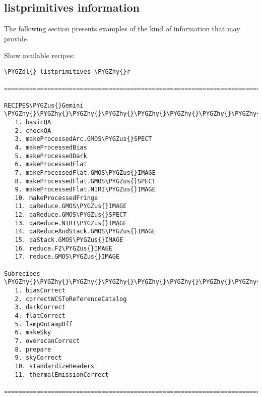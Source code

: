 \documentclass[letterpaper,10pt,english]{sphinxmanual}
\def\PYGZus{\char`\_}
\def\PYGZdl{\char`\$}
\def\PYGZhy{\char`\-}
\begin{document}
\subsection{listprimitives information}
\label{supptools:listprimitives-information}
The following section presents examples of the kind of information that
 may provide.

Show available recipes:

\begin{Verbatim}[commandchars=\\\{\}]
\PYGZdl{} listprimitives \PYGZhy{}r

===============================================================================

RECIPES\PYGZus{}Gemini
\PYGZhy{}\PYGZhy{}\PYGZhy{}\PYGZhy{}\PYGZhy{}\PYGZhy{}\PYGZhy{}\PYGZhy{}\PYGZhy{}\PYGZhy{}\PYGZhy{}\PYGZhy{}\PYGZhy{}\PYGZhy{}\PYGZhy{}\PYGZhy{}\PYGZhy{}\PYGZhy{}\PYGZhy{}\PYGZhy{}\PYGZhy{}\PYGZhy{}\PYGZhy{}\PYGZhy{}\PYGZhy{}\PYGZhy{}\PYGZhy{}\PYGZhy{}\PYGZhy{}\PYGZhy{}\PYGZhy{}\PYGZhy{}\PYGZhy{}\PYGZhy{}\PYGZhy{}\PYGZhy{}\PYGZhy{}\PYGZhy{}\PYGZhy{}\PYGZhy{}\PYGZhy{}\PYGZhy{}\PYGZhy{}\PYGZhy{}\PYGZhy{}\PYGZhy{}\PYGZhy{}\PYGZhy{}\PYGZhy{}\PYGZhy{}\PYGZhy{}\PYGZhy{}\PYGZhy{}\PYGZhy{}\PYGZhy{}\PYGZhy{}\PYGZhy{}\PYGZhy{}\PYGZhy{}\PYGZhy{}\PYGZhy{}\PYGZhy{}\PYGZhy{}\PYGZhy{}\PYGZhy{}\PYGZhy{}\PYGZhy{}\PYGZhy{}\PYGZhy{}\PYGZhy{}\PYGZhy{}\PYGZhy{}\PYGZhy{}\PYGZhy{}\PYGZhy{}\PYGZhy{}\PYGZhy{}\PYGZhy{}\PYGZhy{}
   1. basicQA
   2. checkQA
   3. makeProcessedArc.GMOS\PYGZus{}SPECT
   4. makeProcessedBias
   5. makeProcessedDark
   6. makeProcessedFlat
   7. makeProcessedFlat.GMOS\PYGZus{}IMAGE
   8. makeProcessedFlat.GMOS\PYGZus{}SPECT
   9. makeProcessedFlat.NIRI\PYGZus{}IMAGE
   10. makeProcessedFringe
   11. qaReduce.GMOS\PYGZus{}IMAGE
   12. qaReduce.GMOS\PYGZus{}SPECT
   13. qaReduce.NIRI\PYGZus{}IMAGE
   14. qaReduceAndStack.GMOS\PYGZus{}IMAGE
   15. qaStack.GMOS\PYGZus{}IMAGE
   16. reduce.F2\PYGZus{}IMAGE
   17. reduce.GMOS\PYGZus{}IMAGE

Subrecipes
\PYGZhy{}\PYGZhy{}\PYGZhy{}\PYGZhy{}\PYGZhy{}\PYGZhy{}\PYGZhy{}\PYGZhy{}\PYGZhy{}\PYGZhy{}\PYGZhy{}\PYGZhy{}\PYGZhy{}\PYGZhy{}\PYGZhy{}\PYGZhy{}\PYGZhy{}\PYGZhy{}\PYGZhy{}\PYGZhy{}\PYGZhy{}\PYGZhy{}\PYGZhy{}\PYGZhy{}\PYGZhy{}\PYGZhy{}\PYGZhy{}\PYGZhy{}\PYGZhy{}\PYGZhy{}\PYGZhy{}\PYGZhy{}\PYGZhy{}\PYGZhy{}\PYGZhy{}\PYGZhy{}\PYGZhy{}\PYGZhy{}\PYGZhy{}\PYGZhy{}\PYGZhy{}\PYGZhy{}\PYGZhy{}\PYGZhy{}\PYGZhy{}\PYGZhy{}\PYGZhy{}\PYGZhy{}\PYGZhy{}\PYGZhy{}\PYGZhy{}\PYGZhy{}\PYGZhy{}\PYGZhy{}\PYGZhy{}\PYGZhy{}\PYGZhy{}\PYGZhy{}\PYGZhy{}\PYGZhy{}\PYGZhy{}\PYGZhy{}\PYGZhy{}\PYGZhy{}\PYGZhy{}\PYGZhy{}\PYGZhy{}\PYGZhy{}\PYGZhy{}\PYGZhy{}\PYGZhy{}\PYGZhy{}\PYGZhy{}\PYGZhy{}\PYGZhy{}\PYGZhy{}\PYGZhy{}\PYGZhy{}\PYGZhy{}
   1. biasCorrect
   2. correctWCSToReferenceCatalog
   3. darkCorrect
   4. flatCorrect
   5. lampOnLampOff
   6. makeSky
   7. overscanCorrect
   8. prepare
   9. skyCorrect
   10. standardizeHeaders
   11. thermalEmissionCorrect

===============================================================================
\end{Verbatim}
\end{document}
